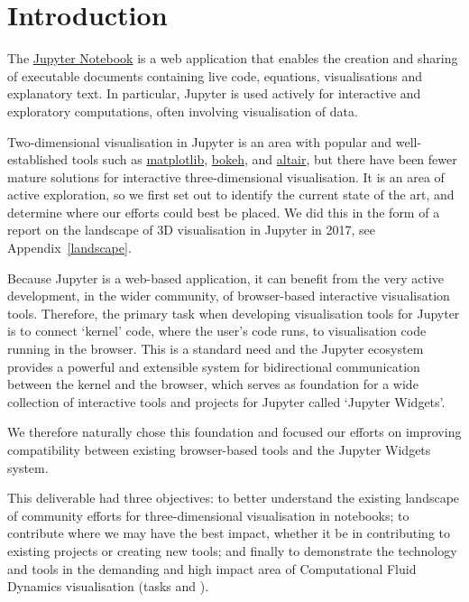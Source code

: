 \documentclass{deliverablereport}
\author{Benjamin Ragan-Kelley, Vidar Tonaas Fauske, Marcin Kostur}
\begin{document}
\maketitle
\tableofcontents


\section{Introduction}

The \href{https://jupyter.org}{Jupyter Notebook} is a web application
that enables the creation and sharing of executable documents
containing live code, equations, visualisations and explanatory text.
In particular, Jupyter is used actively for interactive and exploratory computations,
often involving visualisation of data.

Two-dimensional visualisation in Jupyter is an area with popular and well-established tools
such as \href{https://matplotlib.org}{matplotlib}, \href{https://bokeh.pydata.org/}{bokeh}, and \href{https://altair-viz.github.io}{altair},
but there have been fewer mature solutions for interactive three-dimensional visualisation.
It is an area of active exploration,
so we first set out to identify the current state of the art,
and determine where our efforts could best be placed.
We did this in the form of a report on the landscape of 3D
visualisation in Jupyter in 2017, see Appendix~\ref{landscape}.

Because Jupyter is a web-based application, it can benefit from the
very active development, in the wider community, of browser-based
interactive visualisation tools. Therefore, the primary task when
developing visualisation tools for Jupyter is to connect `kernel'
code, where the user's code runs, to visualisation code running in the
browser. This is a standard need and the Jupyter ecosystem provides a
powerful and extensible system for bidirectional communication between
the kernel and the browser, which serves as foundation for a wide
collection of interactive tools and projects for Jupyter called
`Jupyter Widgets'.

We therefore naturally chose this foundation and focused our efforts
on improving compatibility between existing browser-based tools and
the Jupyter Widgets system.

This deliverable had three objectives: to better
understand the existing landscape of community efforts for three-dimensional
visualisation in notebooks; to contribute where we may have the best
impact, whether it be in contributing to existing projects or creating new
tools; and finally to demonstrate the technology and tools in the
demanding and high impact area of Computational Fluid Dynamics
visualisation (tasks  and ).
\end{document}
